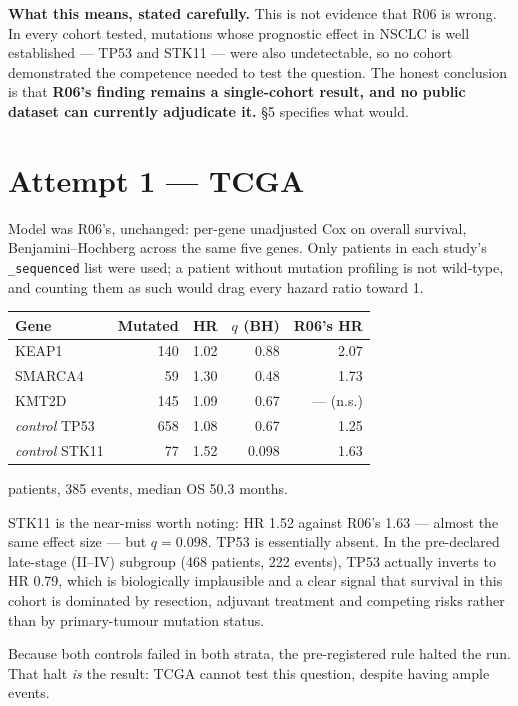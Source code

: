 \documentclass[11pt,a4paper]{article}
\begin{document}
\textbf{What this means, stated carefully.} This is not evidence that R06 is wrong. In every
cohort tested, mutations whose prognostic effect in NSCLC is well established --- TP53 and STK11
--- were also undetectable, so no cohort demonstrated the competence needed to test the
question. The honest conclusion is that \textbf{R06's finding remains a single-cohort result,
and no public dataset can currently adjudicate it.} \S5 specifies what would.

\section{Attempt 1 --- TCGA}

Model was R06's, unchanged: per-gene unadjusted Cox on overall survival, Benjamini--Hochberg
across the same five genes. Only patients in each study's \texttt{\_sequenced} list were used;
a patient without mutation profiling is not wild-type, and counting them as such would drag
every hazard ratio toward 1.

\begin{center}
\begin{tabular}{@{}lrrrr@{}}
\toprule
\textbf{Gene} & \textbf{Mutated} & \textbf{HR} & \textbf{$q$ (BH)} & \textbf{R06's HR} \\
\midrule
KEAP1   & 140 & 1.02 & 0.88 & 2.07 \\
SMARCA4 & \phantom{0}59 & 1.30 & 0.48 & 1.73 \\
KMT2D   & 145 & 1.09 & 0.67 & --- (n.s.) \\
\midrule
\textit{control} TP53  & 658 & 1.08 & 0.67 & 1.25 \\
\textit{control} STK11 & \phantom{0}77 & 1.52 & 0.098 & 1.63 \\
\bottomrule
\end{tabular}
\end{center}

 patients, 385 events, median OS 50.3 months.

STK11 is the near-miss worth noting: HR 1.52 against R06's 1.63 --- almost the same effect size
--- but $q=0.098$. TP53 is essentially absent. In the pre-declared late-stage (II--IV) subgroup
(468 patients, 222 events), TP53 actually inverts to HR 0.79, which is biologically implausible
and a clear signal that survival in this cohort is dominated by resection, adjuvant treatment
and competing risks rather than by primary-tumour mutation status.

Because both controls failed in both strata, the pre-registered rule halted the run. That halt
\emph{is} the result: TCGA cannot test this question, despite having ample events.
\end{document}
